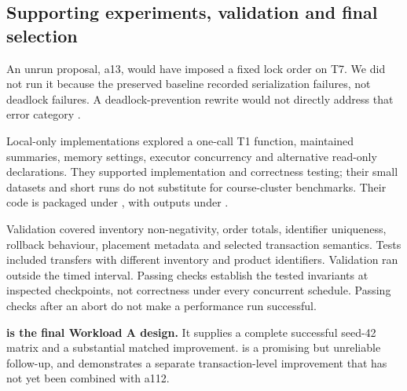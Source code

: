 \subsection{Supporting experiments, validation and final selection}
An unrun proposal, a13, would have imposed a fixed lock order on T7. We did
not run it because the preserved baseline recorded serialization failures,
not deadlock failures. A deadlock-prevention rewrite would not directly
address that error category \citep{pg-isolation}.

Local-only implementations explored a one-call T1 function, maintained
summaries, memory settings, executor concurrency and alternative read-only
declarations. They supported implementation and correctness testing; their
small datasets and short runs do not substitute for course-cluster benchmarks.
Their code is packaged under ,
with outputs under .

Validation covered inventory non-negativity, order totals, identifier uniqueness,
rollback behaviour, placement metadata and selected transaction semantics.
Tests included transfers with different inventory and product identifiers.
Validation ran outside the timed interval. Passing checks establish the tested
invariants at inspected checkpoints, not correctness under every concurrent
schedule. Passing checks after an abort do not make a performance run successful.

\textbf{ is the final Workload A design.} It supplies a complete
successful seed-42 matrix and a substantial matched improvement.  is
a promising but unreliable follow-up, and  demonstrates a separate
transaction-level improvement that has not yet been combined with a112.
